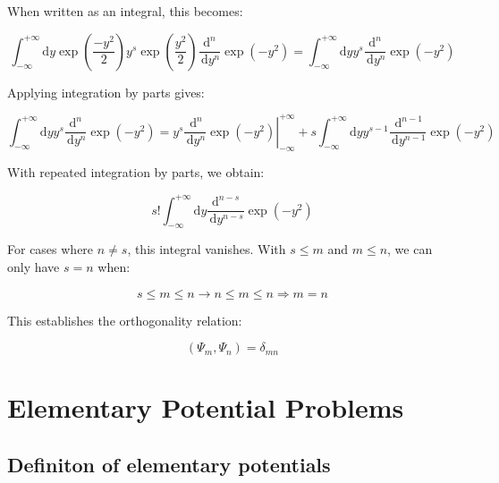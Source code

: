 \documentclass[italian]{HKNdocument}
\begin{document}
When written as an integral, this becomes:

\begin{equation}
\int_{-\infty}^{+\infty} \mathrm{d} y \exp \left(\frac{-y^{2}}{2}\right) y^{s} \exp \left(\frac{y^{2}}{2}\right) \frac{\mathrm{d}^{n}}{\, \mathrm{d} y^{n}} \exp \left(-y^{2}\right)=\int_{-\infty}^{+\infty} \mathrm{d} y y^{s} \frac{\mathrm{d}^{n}}{\, \mathrm{d} y^{n}} \exp \left(-y^{2}\right) \label{eq:5.71}
\end{equation}

Applying integration by parts gives:

\begin{equation}
\int_{-\infty}^{+\infty} \mathrm{d} y y^{s} \frac{\mathrm{d}^{n}}{\, \mathrm{d} y^{n}} \exp \left(-y^{2}\right)=\left.y^{s} \frac{\, \mathrm{d}^{n}}{\, \mathrm{d} y^{n}} \exp \left(-y^{2}\right)\right|_{-\infty} ^{+\infty}+s \int_{-\infty}^{+\infty} \mathrm{d} y y^{s-1} \frac{\, \mathrm{d}^{n-1}}{\, \mathrm{d} y^{n-1}} \exp \left(-y^{2}\right) \label{eq:5.72}
\end{equation}

With repeated integration by parts, we obtain:

\begin{equation}
s!\int_{-\infty}^{+\infty} \mathrm{d} y \frac{\mathrm{d}^{n-s}}{\, \mathrm{d} y^{n-s}} \exp \left(-y^{2}\right) \label{eq:5.73}
\end{equation}

For cases where $n \neq s$, this integral vanishes. With $s \leq m$ and $m \leq n$, we can only have $s = n$ when:

\begin{equation}
s \leq m \leq n \rightarrow n \leq m \leq n \Longrightarrow m=n \label{eq:5.74}
\end{equation}

This establishes the orthogonality relation:

\begin{equation}
\left(\Psi_{m}, \Psi_{n}\right)=\delta_{m n} \label{eq:5.75}
\end{equation}

\section{Elementary Potential Problems}
\subsection{Definiton of elementary potentials}
\end{document}
